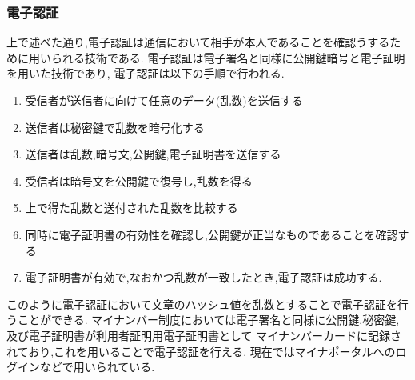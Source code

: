 \documentclass[uplatex,a4j,11pt,dvipdfmx]{jsarticle}
\begin{document}
\subsubsection*{電子認証}
上で述べた通り,電子認証は通信において相手が本人であることを確認うするために用いられる技術である.
電子認証は電子署名と同様に公開鍵暗号と電子証明を用いた技術であり,
電子認証は以下の手順で行われる.
\begin{enumerate}
  \item 受信者が送信者に向けて任意のデータ(乱数)を送信する
  \item 送信者は秘密鍵で乱数を暗号化する
  \item 送信者は乱数,暗号文,公開鍵,電子証明書を送信する
  \item 受信者は暗号文を公開鍵で復号し,乱数を得る
  \item 上で得た乱数と送付された乱数を比較する
  \item 同時に電子証明書の有効性を確認し,公開鍵が正当なものであることを確認する
  \item 電子証明書が有効で,なおかつ乱数が一致したとき,電子認証は成功する.
\end{enumerate}

このように電子認証において文章のハッシュ値を乱数とすることで電子認証を行うことができる.
マイナンバー制度においては電子署名と同様に公開鍵,秘密鍵,及び電子証明書が利用者証明用電子証明書として
マイナンバーカードに記録されており,これを用いることで電子認証を行える.
現在ではマイナポータルへのログインなどで用いられている.

\end{document}
